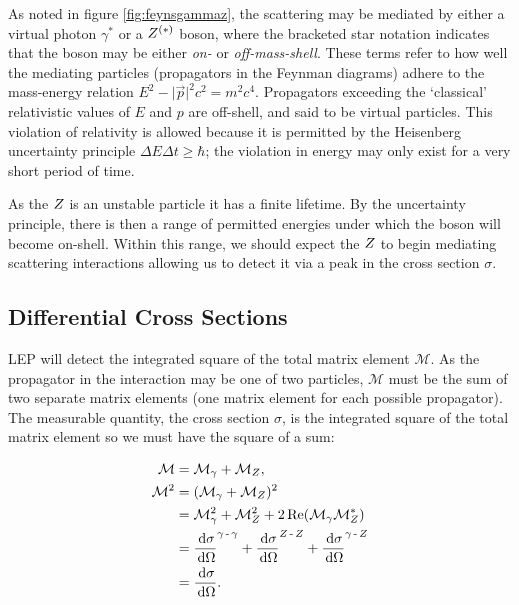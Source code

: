 \documentclass[]{article}
\begin{document}
As noted in figure \ref{fig:feynsgammaz}, the scattering may be mediated by either a virtual photon $\gamma^{*}$ or a $Z ^{(*)}$ boson, where the bracketed star notation indicates that the boson may be either \emph{on-} or \emph{off-mass-shell}. These terms refer to how well the mediating particles (propagators in the Feynman diagrams) adhere to the mass-energy relation $E^{2} - \lvert{\vec{p}}\rvert^{2}c^{2} = m^{2}c^{4}$. Propagators exceeding the `classical' relativistic values of $E$ and $p$ are off-shell, and said to be virtual particles. This violation of relativity is allowed because it is permitted by the Heisenberg uncertainty principle $\Delta E\Delta t \geq \hbar$; the violation in energy may only exist for a very short period of time.

As the $Z $ is an unstable particle it has a finite lifetime. By the uncertainty principle, there is then a range of permitted energies under which the boson will become on-shell. Within this range, we should expect the $Z $ to begin mediating scattering interactions allowing us to detect it via a peak in the cross section $\sigma$. 

\subsection{Differential Cross Sections}

LEP will detect the integrated square of the total matrix element $\mathcal{M}$. As the propagator in the interaction may be one of two particles, $\mathcal{M}$ must be the sum of two separate matrix elements (one matrix element for each possible propagator). The measurable quantity, the cross section $\sigma$, is the integrated square of the total matrix element so we must have the square of a sum:

\begin{align*}
\mathcal{M} &= \mathcal{M}_{\gamma} + \mathcal{M}_{\Zzero},
\\
\mathcal{M}^{2} &= (\mathcal{M}_{\gamma} + \mathcal{M}_{\Zzero})^{2}
\\
&= \mathcal{M}_{\gamma}^{2} + \mathcal{M}_{\Zzero}^{2} + 2\operatorname{Re}(\mathcal{M}_{\gamma}\mathcal{M}_{\Zzero}^{*})
\\
&= \frac{\d{\sigma}}{\d{\Omega}}^{\gamma\operatorname{-}\gamma} +
	\frac{\d{\sigma}}{\d{\Omega}}^{\Zzero\operatorname{-}\Zzero} +
	\frac{\d{\sigma}}{\d{\Omega}}^{\gamma\operatorname{-}\Zzero}
\\
&= \frac{\d{\sigma}}{\d{\Omega}}.
\end{align*}
\end{document}
